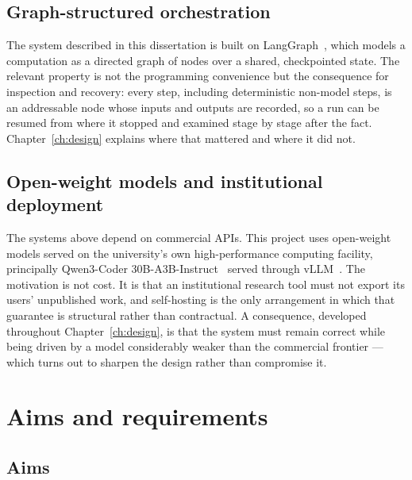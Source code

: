 \subsection{Graph-structured orchestration}

The system described in this dissertation is built on
LangGraph~\cite{langgraph}, which models a computation as a directed graph of nodes over a
shared, checkpointed state. The relevant property is not the programming convenience but the
consequence for inspection and recovery: every step, including deterministic non-model steps,
is an addressable node whose inputs and outputs are recorded, so a run can be resumed from
where it stopped and examined stage by stage after the fact. Chapter~\ref{ch:design} explains
where that mattered and where it did not.

\subsection{Open-weight models and institutional deployment}

The systems above depend on commercial APIs. This project uses open-weight models served on
the university's own high-performance computing facility, principally Qwen3-Coder
30B-A3B-Instruct~\cite{qwen3coder} served through vLLM~\cite{kwon2023vllm}. The motivation is
not cost. It is that an institutional research tool must not export its users' unpublished
work, and self-hosting is the only arrangement in which that guarantee is structural rather
than contractual. A consequence, developed throughout Chapter~\ref{ch:design}, is that the
system must remain correct while being driven by a model considerably weaker than the
commercial frontier --- which turns out to sharpen the design rather than compromise it.

\section{Aims and requirements}
\label{sec:aims}

\subsection{Aims}

